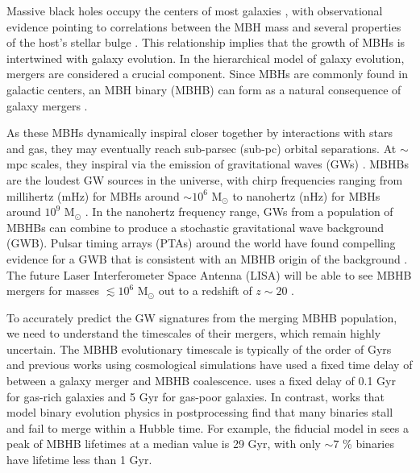 \documentclass[twocolumn,linenumbers]{aastex701}
\newcommand{\msun}{M$_{\odot}$}
\begin{document}
Massive black holes occupy the centers of most galaxies \citep{Kormendy_1995,magorrian_demography_1998}, with observational evidence pointing to correlations between the MBH mass and several properties of the host's stellar bulge \citep{ferrarese_fundamental_2000,tremaine_slope_2002,gultekin_m-sigma_2009,mcconnell_revisiting_2013,Kormendy_2013}. This relationship implies that the growth of MBHs is intertwined with galaxy evolution. In the hierarchical model of galaxy evolution, mergers are considered a crucial component. Since MBHs are commonly found in galactic centers, an MBH binary (MBHB) can form as a natural consequence of galaxy mergers \citep{Begelman1980}.

As these MBHs dynamically inspiral closer together by interactions with stars and gas, they may eventually reach sub-parsec (sub-pc) orbital separations. At $\sim$ mpc scales,  they inspiral via the emission of gravitational waves (GWs) \citep{PetersandMathews1964}. MBHBs are the loudest GW sources in the universe, with chirp frequencies ranging from millihertz (mHz) for MBHs around $\sim 10^6$ \msun{} to nanohertz (nHz) for MBHs around $10^9$ \msun{} \citep{Sesana2013}. In the nanohertz frequency range, GWs from a population of MBHBs can combine to produce a stochastic gravitational wave background (GWB). Pulsar timing arrays (PTAs) around the world have found compelling evidence for a GWB that is consistent with an MBHB origin of the background \citep{agazie_nanograv_2023,antoniadis_second_2023,reardon_search_2023,xu_searching_2023}. The future Laser Interferometer Space Antenna (LISA) will be able to see MBHB mergers for masses  $\lesssim 10^6$  \msun{} out to a redshift of $z \sim 20$ \citep{amaroseoane2017laserinterferometerspaceantenna}. 

To accurately predict the GW signatures from the merging MBHB population, we need to understand the timescales of their mergers, which remain highly uncertain. The MBHB evolutionary timescale is typically of the order of Gyrs and previous works using cosmological simulations \citep{Blecha2016,Salcido_2016} have used a fixed time delay of between a galaxy merger and MBHB coalescence. \citep{Salcido_2016} uses a fixed delay of 0.1 Gyr for gas-rich galaxies and 5 Gyr for gas-poor galaxies. In contrast, works that model binary evolution physics in postprocessing \citep{Kelley_2017a,Katz2020,Volonteri_2020} find that many binaries stall and fail to merge within a Hubble time. For example, the fiducial model in \citet{Kelley_2017a} sees a peak of MBHB lifetimes at a median value is 29 Gyr, with only $\sim 7$ \% binaries have lifetime less than 1 Gyr.
\end{document}
